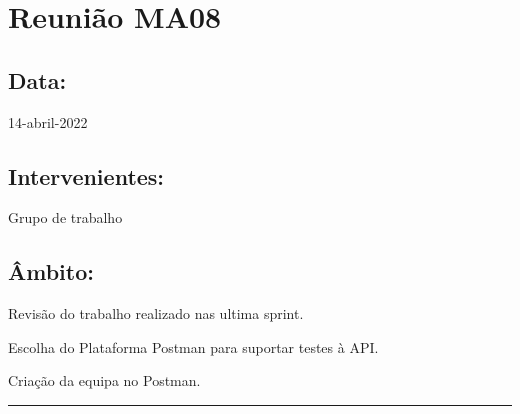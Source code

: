 \section{Reunião MA08}\label{reuniaoMA08}

\subsection*{Data:}
14-abril-2022

\subsection*{Intervenientes:}
Grupo de trabalho

\subsection*{Âmbito:}
Revisão do trabalho realizado nas ultima sprint. 

Escolha do Plataforma Postman para suportar testes à API. 

Criação da equipa no Postman.


\noindent \rule{\linewidth}{0.4pt}
\newline